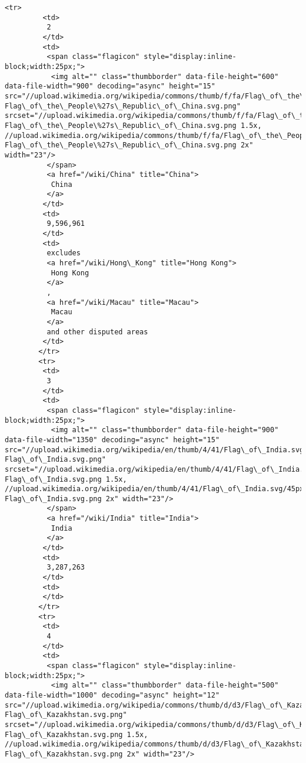 \documentclass[11pt]{article}
\begin{document}
\begin{Verbatim}[commandchars=\\\{\}]
        <tr>
         <td>
          2
         </td>
         <td>
          <span class="flagicon" style="display:inline-block;width:25px;">
           <img alt="" class="thumbborder" data-file-height="600" data-file-width="900" decoding="async" height="15" src="//upload.wikimedia.org/wikipedia/commons/thumb/f/fa/Flag\_of\_the\_People\%27s\_Republic\_of\_China.svg/23px-Flag\_of\_the\_People\%27s\_Republic\_of\_China.svg.png" srcset="//upload.wikimedia.org/wikipedia/commons/thumb/f/fa/Flag\_of\_the\_People\%27s\_Republic\_of\_China.svg/35px-Flag\_of\_the\_People\%27s\_Republic\_of\_China.svg.png 1.5x, //upload.wikimedia.org/wikipedia/commons/thumb/f/fa/Flag\_of\_the\_People\%27s\_Republic\_of\_China.svg/45px-Flag\_of\_the\_People\%27s\_Republic\_of\_China.svg.png 2x" width="23"/>
          </span>
          <a href="/wiki/China" title="China">
           China
          </a>
         </td>
         <td>
          9,596,961
         </td>
         <td>
          excludes
          <a href="/wiki/Hong\_Kong" title="Hong Kong">
           Hong Kong
          </a>
          ,
          <a href="/wiki/Macau" title="Macau">
           Macau
          </a>
          and other disputed areas
         </td>
        </tr>
        <tr>
         <td>
          3
         </td>
         <td>
          <span class="flagicon" style="display:inline-block;width:25px;">
           <img alt="" class="thumbborder" data-file-height="900" data-file-width="1350" decoding="async" height="15" src="//upload.wikimedia.org/wikipedia/en/thumb/4/41/Flag\_of\_India.svg/23px-Flag\_of\_India.svg.png" srcset="//upload.wikimedia.org/wikipedia/en/thumb/4/41/Flag\_of\_India.svg/35px-Flag\_of\_India.svg.png 1.5x, //upload.wikimedia.org/wikipedia/en/thumb/4/41/Flag\_of\_India.svg/45px-Flag\_of\_India.svg.png 2x" width="23"/>
          </span>
          <a href="/wiki/India" title="India">
           India
          </a>
         </td>
         <td>
          3,287,263
         </td>
         <td>
         </td>
        </tr>
        <tr>
         <td>
          4
         </td>
         <td>
          <span class="flagicon" style="display:inline-block;width:25px;">
           <img alt="" class="thumbborder" data-file-height="500" data-file-width="1000" decoding="async" height="12" src="//upload.wikimedia.org/wikipedia/commons/thumb/d/d3/Flag\_of\_Kazakhstan.svg/23px-Flag\_of\_Kazakhstan.svg.png" srcset="//upload.wikimedia.org/wikipedia/commons/thumb/d/d3/Flag\_of\_Kazakhstan.svg/35px-Flag\_of\_Kazakhstan.svg.png 1.5x, //upload.wikimedia.org/wikipedia/commons/thumb/d/d3/Flag\_of\_Kazakhstan.svg/46px-Flag\_of\_Kazakhstan.svg.png 2x" width="23"/>

\end{Verbatim}
\end{document}
